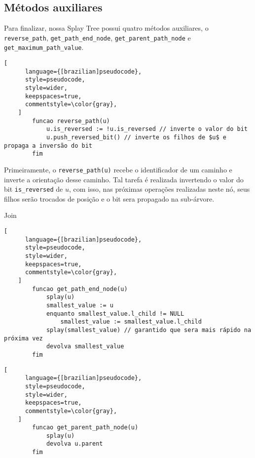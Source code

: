 \subsection{Métodos auxiliares}
\label{subsection:lct-splay-aux}

Para finalizar, nossa Splay Tree possui quatro métodos auxiliares, o \texttt{reverse\_path}, \texttt{get\_path\_end\_node}, \texttt{get\_parent\_path\_node} e \texttt{get\_maximum\_path\_value}.

\begin{programruledcaption}{\label{splay:reverse-path}}
    \begin{lstlisting}[
      language={[brazilian]pseudocode},
      style=pseudocode,
      style=wider,
      keepspaces=true,
      commentstyle=\color{gray},
    ]
        funcao reverse_path(u)
            u.is_reversed := !u.is_reversed // inverte o valor do bit
            u.push_reversed_bit() // inverte os filhos de $u$ e propaga a inversão do bit
        fim
    \end{lstlisting}
\end{programruledcaption}

Primeiramente, o \texttt{reverse\_path(u)} recebe o identificador de um caminho e inverte a orientação desse caminho. Tal tarefa é realizada invertendo o valor do bit \texttt{is\_reversed} de $u$, com isso, nas próximas operações realizadas neste nó, seus filhos serão trocados de posição e o bit sera propagado na sub-árvore.

\begin{programruledcaption}{Join\label{splay:get-path-end}}
    \begin{lstlisting}[
      language={[brazilian]pseudocode},
      style=pseudocode,
      style=wider,
      keepspaces=true,
      commentstyle=\color{gray},
    ]
        funcao get_path_end_node(u)
            splay(u)
            smallest_value := u
            enquanto smallest_value.l_child != NULL
                smallest_value := smallest_value.l_child
            splay(smallest_value) // garantido que sera mais rápido na próxima vez
            devolva smallest_value
        fim
    \end{lstlisting}
\end{programruledcaption}

\begin{programruledcaption}{\label{splay:get-parent-path}}
    \begin{lstlisting}[
      language={[brazilian]pseudocode},
      style=pseudocode,
      style=wider,
      keepspaces=true,
      commentstyle=\color{gray},
    ]
        funcao get_parent_path_node(u)
            splay(u)
            devolva u.parent
        fim
    \end{lstlisting}
\end{programruledcaption}

